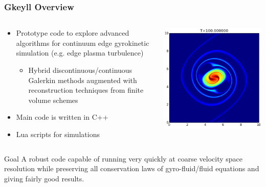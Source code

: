 \documentclass[serif,12pt]{beamer}
\begin{document}
\begin{frame}
\frametitle{Gkeyll Overview}
	\begin{columns}
		\begin{column}{0.7\linewidth}
			\begin{itemize}
			    \item Prototype code to explore advanced algorithms for continuum edge gyrokinetic simulation (e.g. edge plasma turbulence)
			    \begin{itemize}
			    	\item Hybrid discontinuous/continuous Galerkin methods augmented with reconstruction techniques from finite volume schemes
			    \end{itemize}
				\item Main code is written in C++
				\item Lua scripts for simulations
			\end{itemize}
		\end{column}
		\begin{column}{0.3\linewidth}
			\includegraphics[width=\textwidth]{figures/s139-vortex-waltz_00010.png}
		\end{column}
	\end{columns}

	\begin{block}{Goal}
	      A robust code capable of running very quickly at
	      coarse velocity space resolution while preserving all
	      conservation laws of gyro-fluid/fluid equations and giving
	      fairly good results.
	  \end{block}
\end{frame}
\end{document}
